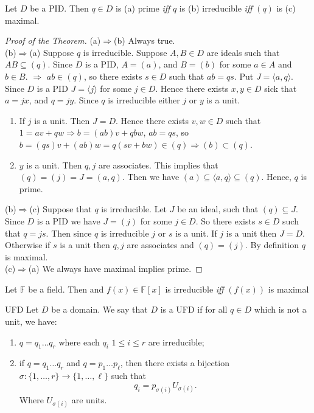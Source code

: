 \documentclass[twoside, openright, fontsize=10pt, headings=big]{scrbook}
\begin{document}
\begin{theorem}{}{}
    Let $D$ be a PID. Then $q\in D$ is (a) prime \textit{iff} $q$ is (b) irreducible \textit{iff} $(q)$ is (c) maximal.
\end{theorem}
\begin{proof}[Proof of the Theorem]
    (a)$\Rightarrow$(b) Always true.\\
    (b)$\Rightarrow$(a) Suppose $q$ is irreducible. Suppose $A,B\in D$ are ideals such that $AB\subseteq (q)$. Since $D$ is a PID, $A=(a)$, and $B=(b)$ for some $a\in A$ and $b\in B$. $\Rightarrow$ $ab\in(q)$, so there exists $s\in D$ such that $ab=qs$. Put $J=\langle a,q \rangle$. Since $D$ is a PID $J=\langle j\rangle$ for some $j\in D$. Hence there exists $x,y\in D$ sick that $a=jx$, and $q=jy$. Since $q$ is irreducible either $j$ or $y$ is a unit. 
    \begin{enumerate}
        \item If $j$ is a unit. Then $J=D$. Hence there exists $v,w\in D$ such that $1=av+qw\Rightarrow b=(ab)v+qbw$, $ab=qs$, so $b=(qs)v+(ab)w=q(sv+bw)\in(q)\Rightarrow (b)\subset(q)$.
        \item $y$ is a unit. Then $q,j$ are associates. This implies that $(q)=(j)=J=(a,q)$. Then we have $(a)\subseteq\langle a,q\rangle\subseteq(q)$. Hence, $q$ is prime. 
    \end{enumerate}
    (b)$\Rightarrow$(c) Suppose that $q$ is irreducible. Let $J$ be an ideal, such that $(q)\subseteq J$. Since $D$ is a PID we have $J=(j)$ for some $j\in D$. So there exists $s\in D$ such that $q=js$. Then since $q$ is irreducible $j$ or $s$ is a unit. If $j$ is a unit then $J=D$. Otherwise if $s$ is a unit then $q,j$ are associates and $(q)=(j)$. By definition $q$ is maximal.\\
    (c)$\Rightarrow$(a) We always have maximal implies prime.
\end{proof}
\begin{corollary}{}{}
    Let $\mathbb{F}$ be a field. Then and $f(x)\in\mathbb{F}[x]$ is irreducible \textit{iff} $(f(x))$ is maximal
\end{corollary}
\begin{definition}{UFD}{}
    Let $D$ be a domain. We say that $D$ is a UFD if for all $q\in D$ which is not a unit, we have:
    \begin{enumerate}[label=(\alph*)]
        \item $q=q_1\dots q_r$ where each $q_i$ $1\leq i\leq r$ are irreducible;
        \item if $q=q_1\dots q_r$ and $q=p_1\dots p_\ell$, then there exists a bijection $\sigma:\{1,\dots,r\}\to\{1,\dots,\ell\}$ such that 
        \[
            q_i=p_{\sigma(i)}U_{\sigma(i)}.
        \]
        Where $U_{\sigma(i)}$ are units.  
    \end{enumerate}
\end{definition}
\end{document}

